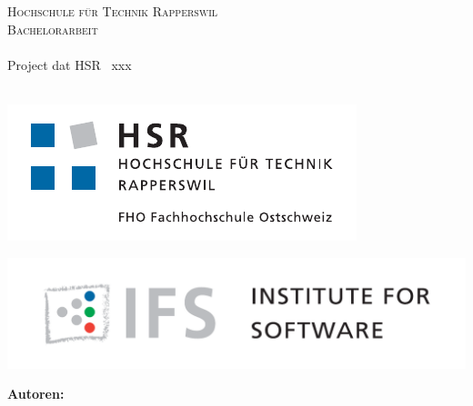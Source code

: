 
\author{
	\rlif \\
	\and
	\chuf \\
	\and
	\fscf \\
}

\clearpage
\begin{titlepage}
	
	\begin{center}
		\textsc{Hochschule für Technik Rapperswil} \\
		\textsc{Bachelorarbeit} \\ [25pt]
		\hr{0.5pt} \\[0.4cm]
		\huge Project dat HSR \textendash\ xxx \\
		\hr{2pt} \\[0.5cm]
		
		
		\begin{figure}[H]
			\centering
		\end{figure}
		
		\begin{minipage}{0.49\textwidth}
			\includegraphics[width=\textwidth]{fig/hsr-logo}
		\end{minipage}
		\begin{minipage}{0.49\textwidth}
			\includegraphics[width=\textwidth]{fig/ifs-logo}
		\end{minipage}
		
		\vfill
	\end{center}
	
		
	\begin{flushleft}
		\textbf{\LARGE Autoren:}\\
		\Large \rlif \\
		\Large \chuf \\
		\Large \fscf \\
		\vspace{1cm}
		

\end{flushleft}
\end{titlepage}
